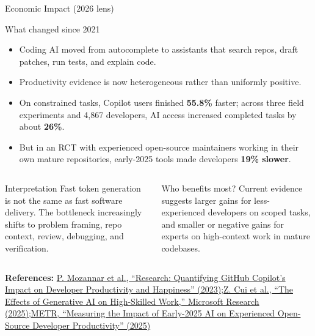 \documentclass[aspectratio=43,9pt]{beamer}
\newcommand{\srclink}[2]{\href{#2}{\textcolor{black!68}{#1}}}
\newcommand{\sep}{;\hspace{0.35em}}
\newcommand{\refline}[2][References]{%
  \vfill
  {\raggedright\fontsize{5.1}{5.5}\selectfont\color{black!68}\textbf{#1:} #2\par}%
}
\newcommand{\srcCopilotMSR}{\srclink{P. Mozannar et al., ``Research: Quantifying GitHub Copilot's Impact on Developer Productivity and Happiness'' (2023)}{https://arxiv.org/abs/2302.06590}}
\newcommand{\srcCui}{\srclink{Z. Cui et al., ``The Effects of Generative AI on High-Skilled Work,'' Microsoft Research (2025)}{https://www.microsoft.com/en-us/research/publication/the-effects-of-generative-ai-on-high-skilled-work-evidence-from-three-field-experiments-with-software-developers/}}
\newcommand{\srcMETR}{\srclink{METR, ``Measuring the Impact of Early-2025 AI on Experienced Open-Source Developer Productivity'' (2025)}{https://arxiv.org/abs/2507.09089}}
\begin{document}
\begin{frame}{Economic Impact (2026 lens)}
\scriptsize
\begin{block}{What changed since 2021}
\begin{itemize}
  \item Coding AI moved from autocomplete to assistants that search repos, draft patches, run tests, and explain code.
  \item Productivity evidence is now heterogeneous rather than uniformly positive.
  \item On constrained tasks, Copilot users finished \textbf{55.8\%} faster; across three field experiments and 4,867 developers, AI access increased completed tasks by about \textbf{26\%}.
  \item But in an RCT with experienced open-source maintainers working in their own mature repositories, early-2025 tools made developers \textbf{19\% slower}.
\end{itemize}
\end{block}

\begin{columns}[T,totalwidth=\textwidth]
\begin{block}{Interpretation}
Fast token generation is not the same as fast software delivery. The bottleneck increasingly shifts to problem framing, repo context, review, debugging, and verification.
\end{block}

\begin{block}{Who benefits most?}
Current evidence suggests larger gains for less-experienced developers on scoped tasks, and smaller or negative gains for experts on high-context work in mature codebases.
\end{block}
\end{columns}

\refline{\srcCopilotMSR\sep \srcCui\sep \srcMETR}
\end{frame}
\end{document}
